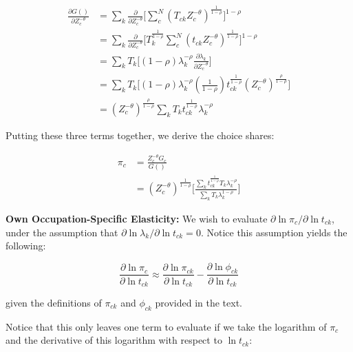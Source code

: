\documentclass[10pt]{article}
\begin{document}
\begin{align*}
    \frac{\partial{G()}}{\partial{Z_{c}^{-\theta}}} & = \sum\limits_{k}\frac{\partial}{\partial{Z_{c}^{-\theta}}}\Big[\sum\limits_{c}^{N}({T_{ck}}{Z_{c}^{-\theta}})^{\frac{1}{1-\rho}}\Big]^{1-\rho} \\ &= \sum\limits_{k}\frac{\partial}{\partial{Z_{c}^{-\theta}}}\Big[{T^{\frac{1}{1-\rho}}_{k}}\sum\limits_{c}^{N}({t_{ck}}{Z_{c}^{-\theta}})^{\frac{1}{1-\rho}}\Big]^{1-\rho} \\ &= \sum\limits_{k}{T_{k}}\Big[(1-\rho)\lambda^{-\rho}_{k}\frac{\partial{\lambda_{k}}}{\partial{Z_{c}^{-\theta}}}\Big] \\ &= \sum\limits_{k}{T_{k}}\Big[(1-\rho)\lambda^{-\rho}_{k}(\frac{1}{1-\rho}){t^{\frac{1}{1-\rho}}_{ck}}(Z_{c}^{-\theta})^{\frac{\rho}{1-\rho}}\Big]\\ &= (Z_{c}^{-\theta})^{\frac{\rho}{1-\rho}}\sum\limits_{k}{T_{k}}{t^{\frac{1}{1-\rho}}_{ck}}\lambda_{k}^{-\rho}
\end{align*}

Putting these three terms together, we derive the choice shares:

\begin{align*}
    \pi_{c} & = \frac{Z_{c}^{-\theta}{G_{c}}}{G()} \\ &= (Z_{c}^{-\theta})^{\frac{1}{1-\rho}}\Bigg[\frac{\sum\limits_{k}{t^{\frac{1}{1-\rho}}_{ck}}{T_{k}}\lambda_{k}^{-\rho}}{\sum\limits_{k}{T_{k}}\lambda_{k}^{1-\rho}}\Bigg]
\end{align*}

\noindent\textbf{Own Occupation-Specific Elasticity:} We wish to evaluate $\partial\ln{\pi_{c}}/\partial\ln{t_{ck}}$, under the assumption that $\partial\ln{\lambda_{k}}/\partial\ln{t_{ck}}=0$. Notice this assumption yields the following:

\begin{equation*}
    \frac{\partial\ln{\pi_{c}}}{\partial\ln{t_{ck}}} \approx \frac{\partial\ln{\pi_{ck}}}{\partial\ln{t_{ck}}} - \frac{\partial\ln{\phi_{ck}}}{\partial\ln{t_{ck}}}
\end{equation*}

given the definitions of $\pi_{ck}$ and $\phi_{ck}$ provided in the text.

Notice that this only leaves one term to evaluate if we take the logarithm of $\pi_{c}$ and the derivative of this logarithm with respect to $\ln{t_{ck}}$:
\end{document}
